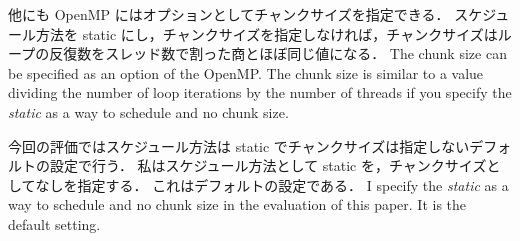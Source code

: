 他にも OpenMP にはオプションとしてチャンクサイズを指定できる．
スケジュール方法を static にし，チャンクサイズを指定しなければ，チャンクサイズはループの反復数をスレッド数で割った商とほぼ同じ値になる．
\fi
The chunk size can be specified as an option of the OpenMP.
The chunk size is similar to a value dividing the number of loop iterations by the number of threads
if you specify the \textit{static} as a way to schedule and no chunk size.

今回の評価ではスケジュール方法は static でチャンクサイズは指定しないデフォルトの設定で行う．
私はスケジュール方法として static を，チャンクサイズとしてなしを指定する．
これはデフォルトの設定である．
\fi
I specify the \textit{static} as a way to schedule and no chunk size in the evaluation of this paper.
It is the default setting.
